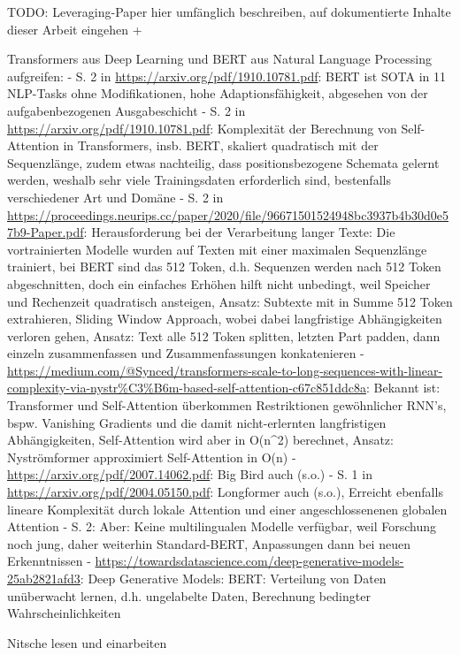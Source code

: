 TODO: Leveraging-Paper hier umfänglich beschreiben, auf dokumentierte Inhalte dieser Arbeit eingehen + \cite{VAS17}

Transformers aus Deep Learning und BERT aus Natural Language Processing aufgreifen:
- S. 2 in \url{https://arxiv.org/pdf/1910.10781.pdf}:
  BERT ist SOTA in 11 NLP-Tasks ohne Modifikationen, hohe Adaptionsfähigkeit,
  abgesehen von der aufgabenbezogenen Ausgabeschicht
- S. 2 in \url{https://arxiv.org/pdf/1910.10781.pdf}:
  Komplexität der Berechnung von Self-Attention in Transformers, insb. BERT,
  skaliert quadratisch mit der Sequenzlänge,
  zudem etwas nachteilig, dass positionsbezogene Schemata gelernt werden,
  weshalb sehr viele Trainingsdaten erforderlich sind, bestenfalls verschiedener Art und Domäne
- S. 2 in \url{https://proceedings.neurips.cc/paper/2020/file/96671501524948bc3937b4b30d0e57b9-Paper.pdf}:
  Herausforderung bei der Verarbeitung langer Texte:
  Die vortrainierten Modelle wurden auf Texten mit einer maximalen Sequenzlänge trainiert,
  bei BERT sind das 512 Token, d.h. Sequenzen werden nach 512 Token abgeschnitten,
  doch ein einfaches Erhöhen hilft nicht unbedingt, weil Speicher und Rechenzeit quadratisch ansteigen,
  Ansatz: Subtexte mit in Summe 512 Token extrahieren, Sliding Window Approach,
  wobei dabei langfristige Abhängigkeiten verloren gehen,
  Ansatz: Text alle 512 Token splitten, letzten Part padden,
  dann einzeln zusammenfassen und Zusammenfassungen konkatenieren
- \url{https://medium.com/@Synced/transformers-scale-to-long-sequences-with-linear-complexity-via-nystr\%C3\%B6m-based-self-attention-c67c851ddc8a}:
  Bekannt ist: Transformer und Self-Attention überkommen Restriktionen gewöhnlicher RNN's, bspw. Vanishing Gradients
  und die damit nicht-erlernten langfristigen Abhängigkeiten, Self-Attention wird aber in O(n^2) berechnet,
  Ansatz: Nyströmformer approximiert Self-Attention in O(n)
- \url{https://arxiv.org/pdf/2007.14062.pdf}: Big Bird auch (s.o.)
- S. 1 in \url{https://arxiv.org/pdf/2004.05150.pdf}: Longformer auch (s.o.),
  Erreicht ebenfalls lineare Komplexität durch lokale Attention und einer
  angeschlossenenen globalen Attention
- S. 2: Aber: Keine multilingualen Modelle verfügbar, weil Forschung noch jung,
  daher weiterhin Standard-BERT, Anpassungen dann bei neuen Erkenntnissen
- \url{https://towardsdatascience.com/deep-generative-models-25ab2821afd3}:
  Deep Generative Models: BERT: Verteilung von Daten unüberwacht lernen,
  d.h. ungelabelte Daten, Berechnung bedingter Wahrscheinlichkeiten

Nitsche lesen und einarbeiten

